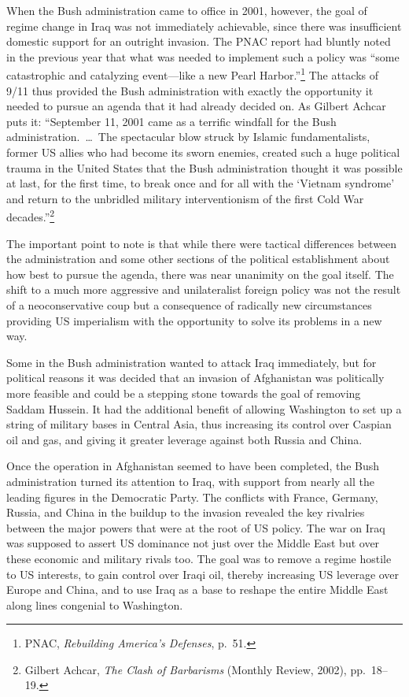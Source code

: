 When the Bush administration came to office in 2001, however, the goal of regime change in Iraq was not immediately achievable, since there was insufficient domestic support for an outright invasion. The PNAC report had bluntly noted in the previous year that what was needed to implement such a policy was ``some catastrophic and catalyzing event---like a new Pearl Harbor.''\footnote{PNAC, \emph{Rebuilding America's Defenses}, p.\ 51.} The attacks of 9/11 thus provided the Bush administration with exactly the opportunity it needed to pursue an agenda that it had already decided on. As Gilbert Achcar puts it: ``September 11, 2001 came as a terrific windfall for the Bush administration.\ \ldots\ The spectacular blow struck by Islamic fundamentalists, former US allies who had become its sworn enemies, created such a huge political trauma in the United States that the Bush administration thought it was possible at last, for the first time, to break once and for all with the `Vietnam syndrome' and return to the unbridled military interventionism of the first Cold War decades.''\footnote{Gilbert Achcar, \emph{The Clash of Barbarisms} (Monthly Review, 2002), pp.\ 18--19.}

The important point to note is that while there were tactical differences between the administration and some other sections of the political establishment about how best to pursue the agenda, there was near unanimity on the goal itself. The shift to a much more aggressive and unilateralist foreign policy was not the result of a neoconservative coup but a consequence of radically new circumstances providing US imperialism with the opportunity to solve its problems in a new way.

Some in the Bush administration wanted to attack Iraq immediately, but for political reasons it was decided that an invasion of Afghanistan was politically more feasible and could be a stepping stone towards the goal of removing Saddam Hussein. It had the additional benefit of allowing Washington to set up a string of military bases in Central Asia, thus increasing its control over Caspian oil and gas, and giving it greater leverage against both Russia and China.

Once the operation in Afghanistan seemed to have been completed, the Bush administration turned its attention to Iraq, with support from nearly all the leading figures in the Democratic Party. The conflicts with France, Germany, Russia, and China in the buildup to the invasion revealed the key rivalries between the major powers that were at the root of US policy. The war on Iraq was supposed to assert US dominance not just over the Middle East but over these economic and military rivals too. The goal was to remove a regime hostile to US interests, to gain control over Iraqi oil, thereby increasing US leverage over Europe and China, and to use Iraq as a base to reshape the entire Middle East along lines congenial to Washington.

